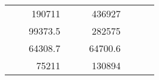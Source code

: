 \begin{table}[H]
\begin{tabular}{|ccrccrccc}
\multicolumn{1}{|c|}{\cellcolor[HTML]{FFFFC7}}                                & \multicolumn{1}{c|}{\cellcolor[HTML]{DDFDFF}}                      & \multicolumn{1}{r|}{\cellcolor[HTML]{DAE8FC}190711}    & \multicolumn{1}{c|}{\cellcolor[HTML]{FFFFC7}}                                & \multicolumn{1}{c|}{\cellcolor[HTML]{DDFDFF}}                       & \multicolumn{1}{r|}{\cellcolor[HTML]{DDFDFF}436927}    &                                                                              &                                                                    &                                                        \\ \cline{3-3} \cline{6-6}
\multicolumn{1}{|c|}{\cellcolor[HTML]{FFFFC7}}                                & \multicolumn{1}{c|}{\cellcolor[HTML]{DDFDFF}}                      & \multicolumn{1}{r|}{\cellcolor[HTML]{DDFDFF}99373.5}   & \multicolumn{1}{c|}{\cellcolor[HTML]{FFFFC7}}                                & \multicolumn{1}{c|}{\cellcolor[HTML]{DDFDFF}}                       & \multicolumn{1}{r|}{\cellcolor[HTML]{DAE8FC}282575}    &                                                                              &                                                                    &                                                        \\ \cline{3-3} \cline{6-6}
\multicolumn{1}{|c|}{\cellcolor[HTML]{FFFFC7}}                                & \multicolumn{1}{c|}{\cellcolor[HTML]{DDFDFF}}                      & \multicolumn{1}{r|}{\cellcolor[HTML]{DAE8FC}64308.7}   & \multicolumn{1}{c|}{\cellcolor[HTML]{FFFFC7}}                                & \multicolumn{1}{c|}{\cellcolor[HTML]{DDFDFF}}                       & \multicolumn{1}{r|}{\cellcolor[HTML]{DDFDFF}64700.6}   &                                                                              &                                                                    &                                                        \\ \cline{3-3} \cline{6-6}
\multicolumn{1}{|c|}{\cellcolor[HTML]{FFFFC7}}                                & \multicolumn{1}{c|}{\cellcolor[HTML]{DDFDFF}}                      & \multicolumn{1}{r|}{\cellcolor[HTML]{DDFDFF}75211}     & \multicolumn{1}{c|}{\cellcolor[HTML]{FFFFC7}}                                & \multicolumn{1}{c|}{\cellcolor[HTML]{DDFDFF}}                       & \multicolumn{1}{r|}{\cellcolor[HTML]{DAE8FC}130894}    &                                                                              &                                                                    &                                                        \\ \cline{3-3} \cline{6-6}

\end{tabular}
\end{table}
